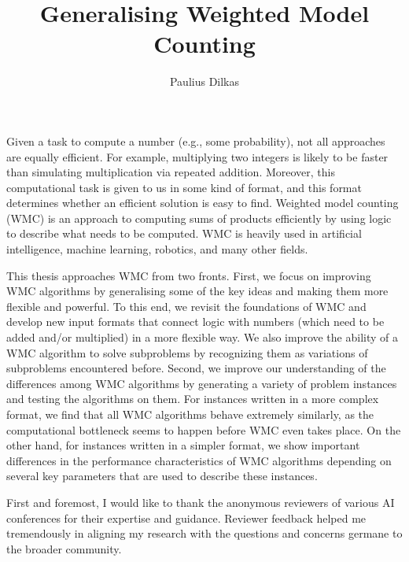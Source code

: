 \documentclass[phd,aiai,twoside,fullspacing,logo]{infthesis}
\title{Generalising Weighted Model Counting}
\author{Paulius Dilkas}
\theoremstyle{definition}
\theoremstyle{remark}
\numberwithin{assumption}{chapter}
\numberwithin{conjecture}{chapter}
\numberwithin{constraint}{chapter}
\numberwithin{fact}{chapter}
\numberwithin{proposition}{chapter}
\numberwithin{theorem}{chapter}
\numberwithin{lemma}{chapter}
\numberwithin{definition}{chapter}
\numberwithin{example}{chapter}
\numberwithin{experiment}{chapter}
\begin{document}
\nobibliography*

\begin{preliminary}

\maketitle

\begin{laysummary}
  Given a task to compute a number (e.g., some probability), not all approaches
  are equally efficient. For example, multiplying two integers is likely to be
  faster than simulating multiplication via repeated addition. Moreover, this
  computational task is given to us in some kind of format, and this format
  determines whether an efficient solution is easy to find. Weighted model
  counting (WMC) is an approach to computing sums of products efficiently by
  using logic to describe what needs to be computed. WMC is heavily used in
  artificial intelligence, machine learning, robotics, and many other fields.

  This thesis approaches WMC from two fronts. First, we focus on improving WMC
  algorithms by generalising some of the key ideas and making them more flexible
  and powerful. To this end, we revisit the foundations of WMC and develop new
  input formats that connect logic with numbers (which need to be added and/or
  multiplied) in a more flexible way. We also improve the ability of a WMC
  algorithm to solve subproblems by recognizing them as variations of
  subproblems encountered before. Second, we improve our understanding of the
  differences among WMC algorithms by generating a variety of problem instances
  and testing the algorithms on them. For instances written in a more complex
  format, we find that all WMC algorithms behave extremely similarly, as the
  computational bottleneck seems to happen before WMC even takes place. On the
  other hand, for instances written in a simpler format, we show important
  differences in the performance characteristics of WMC algorithms depending on
  several key parameters that are used to describe these instances.
\end{laysummary}

\begin{acknowledgements}
  First and foremost, I would like to thank the anonymous reviewers of various
  AI conferences for their expertise and guidance. Reviewer feedback helped me
  tremendously in aligning my research with the questions and concerns germane
  to the broader community.


\end{acknowledgements}
\end{preliminary}
\end{document}
